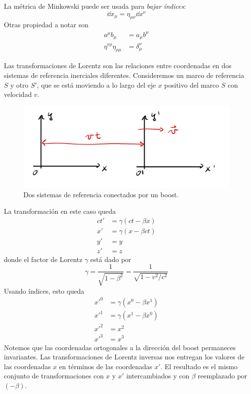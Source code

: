La métrica de Minkowski puede ser usada para \textit{bajar índices}:
\begin{equation}
    \dd x_\mu=\eta_{\mu\nu}\dd x^\nu
\end{equation}
Otras propiedad a notar son
\begin{align}
    a^\mu b_\mu&=a_\mu b^\mu\\
    \eta^{\nu\rho}\eta_{\rho\mu}&=\delta^\nu_\mu
\end{align}

Las transformaciones de Lorentz son las relaciones entre coordenadas en dos sistemas de referencia inerciales diferentes. Consideremos un marco de referencia $S$ y otro $S'$, que se está moviendo a lo largo del eje $x$ positivo del marco $S$ con velocidad $v$.
\begin{figure}[h!]
    \centering
    \includegraphics[scale=0.1]{img/Lorentz.jpeg}
    \caption{Dos sistemas de referencia conectados por un boost.}
    \label{fig:2.1}
\end{figure}

La transformación en este caso queda
\begin{align}
    ct'&=\gamma(ct-\beta x)\\
    x'&=\gamma(x-\beta ct)\\
    y'&=y\\
    z'&=z
\end{align}
donde el factor de Lorentz $\gamma$ está dado por
\begin{equation}
    \gamma =\frac{1}{\sqrt{1-\beta^2}}=\frac{1}{\sqrt{1-v^2/c^2}}
\end{equation}
Usando índices, esto queda
\begin{equation}\label{2.36}
\begin{split}
    x'^0&=\gamma(x^0-\beta x^1)\\
    x'^1&=\gamma(x^1-\beta x^0)\\
    x'^2&=x^2\\
    x'^3&=x^3
\end{split}
\end{equation}
Notemos que las coordenadas ortogonales a la dirección del boost permaneces invariantes. Las transformaciones de Lorentz inversas nos entregan los valores de las coordenadas $x$ en términos de las coordenadas $x'$. El resultado es el mismo conjunto de transformaciones con $x$ y $x'$ intercambiados y con $\beta$ reemplazado por $(-\beta)$.


